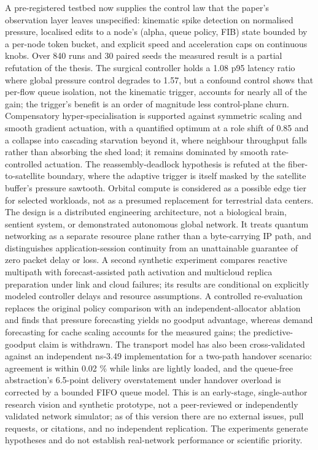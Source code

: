 \documentclass[
  american,
  11pt,
]{article}
\begin{document}
A pre-registered testbed now supplies the control law that the paper's
observation layer leaves unspecified: kinematic spike detection on
normalised pressure, localised edits to a node's (alpha, queue policy,
FIB) state bounded by a per-node token bucket, and explicit speed and
acceleration caps on continuous knobs. Over 840 runs and 30 paired seeds
the measured result is a partial refutation of the thesis. The surgical
controller holds a 1.08 p95 latency ratio where global pressure control
degrades to 1.57, but a confound control shows that per-flow queue
isolation, not the kinematic trigger, accounts for nearly all of the
gain; the trigger's benefit is an order of magnitude less control-plane
churn. Compensatory hyper-specialisation is supported against symmetric
scaling and smooth gradient actuation, with a quantified optimum at a
role shift of 0.85 and a collapse into cascading starvation beyond it,
where neighbour throughput falls rather than absorbing the shed load; it
remains dominated by smooth rate-controlled actuation. The
reassembly-deadlock hypothesis is refuted at the fiber-to-satellite
boundary, where the adaptive trigger is itself masked by the satellite
buffer's pressure sawtooth. Orbital compute is considered as a possible
edge tier for selected workloads, not as a presumed replacement for
terrestrial data centers. The design is a distributed engineering
architecture, not a biological brain, sentient system, or demonstrated
autonomous global network. It treats quantum networking as a separate
resource plane rather than a byte-carrying IP path, and distinguishes
application-session continuity from an unattainable guarantee of zero
packet delay or loss. A second synthetic experiment compares reactive
multipath with forecast-assisted path activation and multicloud replica
preparation under link and cloud failures; its results are conditional
on explicitly modeled controller delays and resource assumptions. A
controlled re-evaluation replaces the original policy comparison with an
independent-allocator ablation and finds that pressure forecasting
yields no goodput advantage, whereas demand forecasting for cache
scaling accounts for the measured gains; the predictive-goodput claim is
withdrawn. The transport model has also been cross-validated against an
independent ns-3.49 implementation for a two-path handover scenario:
agreement is within 0.02 \% while links are lightly loaded, and the
queue-free abstraction's 6.5-point delivery overstatement under handover
overload is corrected by a bounded FIFO queue model. This is an
early-stage, single-author research vision and synthetic prototype, not
a peer-reviewed or independently validated network simulator; as of this
version there are no external issues, pull requests, or citations, and
no independent replication. The experiments generate hypotheses and do
not establish real-network performance or scientific priority.
\end{document}
